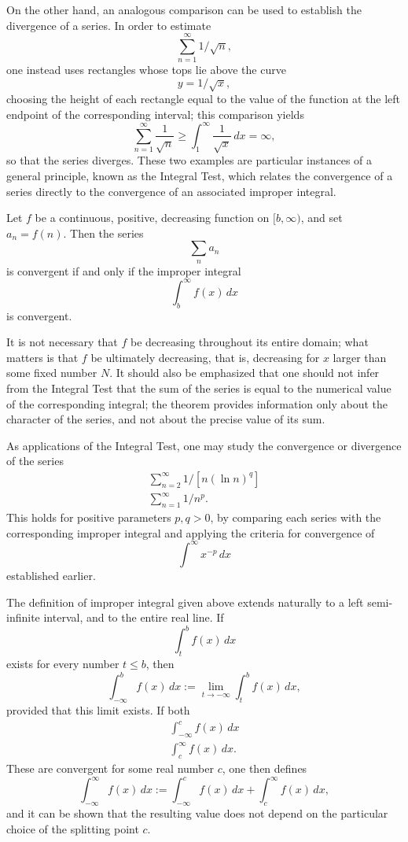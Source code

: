 On the other hand, an analogous comparison can be used to establish the divergence of a series. In order to estimate
\[
\sum_{n=1}^{\infty} 1/\sqrt{n},
\]
one instead uses rectangles whose tops lie above the curve
\[
y = 1/\sqrt{x},
\]
choosing the height of each rectangle equal to the value of the function at the left endpoint of the corresponding interval; this comparison yields
\[
\sum_{n=1}^{\infty} \frac{1}{\sqrt{n}} \geq \int_1^{\infty} \frac{1}{\sqrt{x}} \, dx = \infty,
\]
so that the series diverges. These two examples are particular instances of a general principle, known as the Integral Test, which relates the convergence of a series directly to the convergence of an associated improper integral.

\begin{theorem}
Let $f$ be a continuous, positive, decreasing function on $[b, \infty)$, and set $a_n = f(n)$. Then the series
\[
\sum_n a_n
\]
is convergent if and only if the improper integral
\[
\int_b^{\infty} f(x) \, dx
\]
is convergent.
\end{theorem}

\begin{remark}
It is not necessary that $f$ be decreasing throughout its entire domain; what matters is that $f$ be ultimately decreasing, that is, decreasing for $x$ larger than some fixed number $N$. It should also be emphasized that one should not infer from the Integral Test that the sum of the series is equal to the numerical value of the corresponding integral; the theorem provides information only about the character of the series, and not about the precise value of its sum.
\end{remark}

As applications of the Integral Test, one may study the convergence or divergence of the series
\[
\begin{gathered}
\sum_{n=2}^{\infty} 1/[n (\ln n)^q] \\
\sum_{n=1}^{\infty} 1/n^p.
\end{gathered}
\]
This holds for positive parameters $p, q > 0$, by comparing each series with the corresponding improper integral and applying the criteria for convergence of
\[
\int^{\infty} x^{-p} \, dx
\]
established earlier.

The definition of improper integral given above extends naturally to a left semi-infinite interval, and to the entire real line. If \[
\int_t^b f(x) \, dx
\] exists for every number $t \leq b$, then \[
\int_{-\infty}^{b} f(x) \, dx := \lim_{t \to -\infty} \int_t^b f(x) \, dx,
\] provided that this limit exists. If both
\[
\begin{gathered}
\int_{-\infty}^{c} f(x) \, dx \\
\int_c^{\infty} f(x) \, dx.
\end{gathered}
\]
These are convergent for some real number $c$, one then defines \[
\int_{-\infty}^{\infty} f(x) \, dx := \int_{-\infty}^{c} f(x) \, dx + \int_c^{\infty} f(x) \, dx,
\] and it can be shown that the resulting value does not depend on the particular choice of the splitting point $c$.


